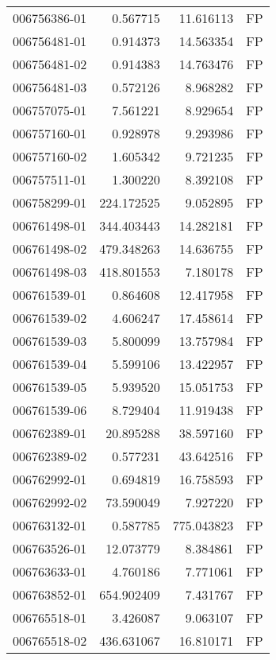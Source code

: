 \begin{tabular}{lrrl}
006756386-01 &    0.567715 &      11.616113 &   FP \\
006756481-01 &    0.914373 &      14.563354 &   FP \\
006756481-02 &    0.914383 &      14.763476 &   FP \\
006756481-03 &    0.572126 &       8.968282 &   FP \\
006757075-01 &    7.561221 &       8.929654 &   FP \\
006757160-01 &    0.928978 &       9.293986 &   FP \\
006757160-02 &    1.605342 &       9.721235 &   FP \\
006757511-01 &    1.300220 &       8.392108 &   FP \\
006758299-01 &  224.172525 &       9.052895 &   FP \\
006761498-01 &  344.403443 &      14.282181 &   FP \\
006761498-02 &  479.348263 &      14.636755 &   FP \\
006761498-03 &  418.801553 &       7.180178 &   FP \\
006761539-01 &    0.864608 &      12.417958 &   FP \\
006761539-02 &    4.606247 &      17.458614 &   FP \\
006761539-03 &    5.800099 &      13.757984 &   FP \\
006761539-04 &    5.599106 &      13.422957 &   FP \\
006761539-05 &    5.939520 &      15.051753 &   FP \\
006761539-06 &    8.729404 &      11.919438 &   FP \\
006762389-01 &   20.895288 &      38.597160 &   FP \\
006762389-02 &    0.577231 &      43.642516 &   FP \\
006762992-01 &    0.694819 &      16.758593 &   FP \\
006762992-02 &   73.590049 &       7.927220 &   FP \\
006763132-01 &    0.587785 &     775.043823 &   FP \\
006763526-01 &   12.073779 &       8.384861 &   FP \\
006763633-01 &    4.760186 &       7.771061 &   FP \\
006763852-01 &  654.902409 &       7.431767 &   FP \\
006765518-01 &    3.426087 &       9.063107 &   FP \\
006765518-02 &  436.631067 &      16.810171 &   FP \\

\end{tabular}
